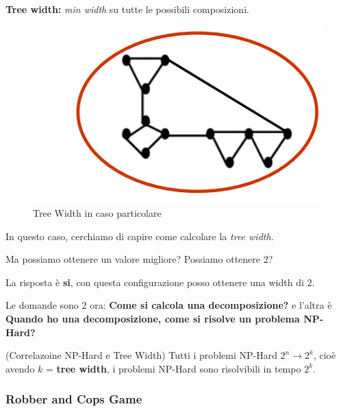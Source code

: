 \textbf{Tree width:} \textit{min width} su tutte le possibili composizioni.
\begin{figure}[H]
    \centering
    \includegraphics[width=0.7\linewidth]{chapters/images/casostrano.png}
    \caption{Tree Width in caso particolare}
    \label{fig:9}
\end{figure}

In questo caso, cerchiamo di capire come calcolare la \textit{ tree width}.






Ma possiamo ottenere un valore migliore? Possiamo ottenere 2?


La risposta è \textbf{si}, con questa configurazione posso ottenere una width
di $2$.

Le domande sono 2 ora: \textbf{Come si calcola una decomposizione?} e l'altra è
\textbf{Quando ho una decomposizione, come si risolve un problema NP-Hard?}

\begin{corollary}(Correlazoine NP-Hard e Tree Width)
    Tutti i problemi NP-Hard $2^n \rightarrow 2^k$, cioè avendo $k$ = \textbf{tree width}, i problemi NP-Hard sono risolvibili in tempo $2^k$.
\end{corollary}

\subsubsection{Robber and Cops Game}

